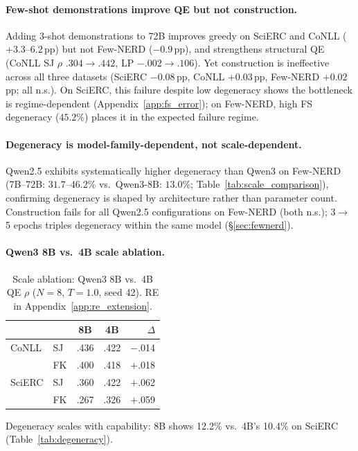 \paragraph{Few-shot demonstrations improve QE but not construction.}
Adding 3-shot demonstrations to 72B improves greedy on SciERC and CoNLL ($+3.3$--$6.2$\,pp) but not Few-NERD ($-0.9$\,pp), and strengthens structural QE (CoNLL SJ $\rho$ $.304{\to}.442$, LP $-.002{\to}.106$). Yet construction is ineffective across all three datasets (SciERC $-0.08$\,pp, CoNLL $+0.03$\,pp, Few-NERD $+0.02$\,pp; all n.s.). On SciERC, this failure despite low degeneracy shows the bottleneck is regime-dependent (Appendix~\ref{app:fs_error}); on Few-NERD, high FS degeneracy ($45.2$\%) places it in the expected failure regime.

\paragraph{Degeneracy is model-family-dependent, not scale-dependent.}
Qwen2.5 exhibits systematically higher degeneracy than Qwen3 on Few-NERD (7B--72B: $31.7$--$46.2$\% vs.\ Qwen3-8B: $13.0$\%; Table~\ref{tab:scale_comparison}), confirming degeneracy is shaped by architecture rather than parameter count. Construction fails for all Qwen2.5 configurations on Few-NERD (both n.s.); 3$\to$5 epochs triples degeneracy within the same model (\S\ref{sec:fewnerd}).

\paragraph{Qwen3 8B vs.\ 4B scale ablation.}

\begin{table}[h]
\centering
\small
\caption{Scale ablation: Qwen3 8B vs.\ 4B QE $\rho$ ($N{=}8$, $T{=}1.0$, seed 42). RE in Appendix~\ref{app:re_extension}.}
\label{tab:scale_ablation_app}
\begin{tabular}{@{}ll cc r@{}}
\toprule
& & \textbf{8B} & \textbf{4B} & $\Delta$ \\
\midrule
CoNLL & SJ & .436 & .422 & $-$.014 \\
      & FK & .400 & .418 & $+$.018 \\
SciERC & SJ & .360 & .422 & $+$.062 \\
       & FK & .267 & .326 & $+$.059 \\
\bottomrule
\end{tabular}
\end{table}

Degeneracy scales with capability: 8B shows 12.2\% vs.\ 4B's 10.4\% on SciERC (Table~\ref{tab:degeneracy}).

